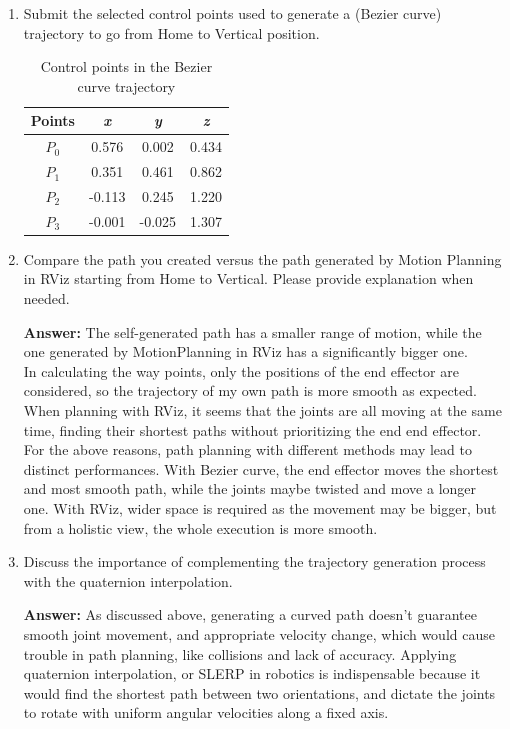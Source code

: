 \documentclass[12pt]{article}
\begin{document}
\begin{enumerate}

    \item Submit the selected control points used to generate a (Bezier curve) trajectory to go from Home to Vertical position.
    
    \begin{table}[H]
        \centering
        \begin{tabular}{cccc}
            \toprule
            Points & \textit{x} & \textit{y} & \textit{z} \\ \midrule
            $P_0$ & 0.576 & 0.002 & 0.434 \\
            $P_1$ & 0.351 & 0.461 & 0.862 \\
            $P_2$ & -0.113 & 0.245 & 1.220 \\
            $P_3$ & -0.001 & -0.025 & 1.307 \\ \bottomrule
        \end{tabular}
        \caption{Control points in the Bezier curve trajectory}
    \end{table}
    
    \item Compare the path you created versus the path generated by Motion Planning in RViz starting from Home to Vertical. Please provide explanation when needed.
    
    \textbf{Answer: }The self-generated path has a smaller range of motion, while the one generated by MotionPlanning in RViz has a significantly bigger one.
    \\In calculating the way points, only the positions of the end effector are considered, so the trajectory of my own path is more smooth as expected. When planning with RViz, it seems that the joints are all moving at the same time, finding their shortest paths without prioritizing the end end effector.
    \\For the above reasons, path planning with different methods may lead to distinct performances. With Bezier curve, the end effector moves the shortest and most smooth path, while the joints maybe twisted and move a longer one. With RViz, wider space is required as the movement may be bigger, but from a holistic view, the whole execution is more smooth.
    
    \item Discuss the importance of complementing the trajectory generation process with the quaternion interpolation.
    
    \textbf{Answer: }As discussed above, generating a curved path doesn't guarantee smooth joint movement, and appropriate velocity change, which would cause trouble in path planning, like collisions and lack of accuracy. Applying quaternion interpolation, or SLERP in robotics is indispensable because it would find the shortest path between two orientations, and dictate the joints to rotate with uniform angular velocities along a fixed axis.
    

\end{enumerate}
\end{document}
